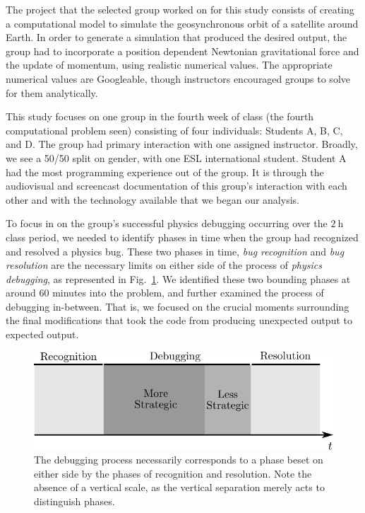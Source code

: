 \documentclass{msuphddissertation}
\begin{document}
\begin{doublespace}
The project that the selected group worked on for this study consists of creating a computational model to simulate the geosynchronous orbit of a satellite around Earth.  In order to generate a simulation that produced the desired output, the group had to incorporate a position dependent Newtonian gravitational force and the update of momentum, using realistic numerical values.  The appropriate numerical values are Googleable, though instructors encouraged groups to solve for them analytically.

This study focuses on one group in the fourth week of class (the fourth computational problem seen) consisting of four individuals: Students A, B, C, and D.  The group had primary interaction with one assigned instructor.  Broadly, we see a 50/50 split on gender, with one ESL international student.  Student A had the most programming experience out of the group.  It is through the audiovisual and screencast documentation of this group's interaction with each other and with the technology available that we began our analysis.

To focus in on the group's successful physics debugging occurring over the $\SI{2}{\hour}$ class period, we needed to identify phases in time when the group had recognized and resolved a physics bug.  These two phases in time, \emph{bug recognition} and \emph{bug resolution} are the necessary limits on either side of the process of \emph{physics debugging}, as represented in Fig.~\ref{CH4:Strategies}.  We identified these two bounding phases at around 60 minutes into the problem, and further examined the process of debugging in-between.  That is, we focused on the crucial moments surrounding the final modifications that took the code from producing unexpected output to expected output.

\begin{figure}\centering
\includegraphics[scale=1]{./images/CH4Strategies.pdf}
\caption{The debugging process necessarily corresponds to a phase beset on either side by the phases of recognition and resolution.  Note the absence of a vertical scale, as the vertical separation merely acts to distinguish phases.}\label{CH4:Strategies}
\end{figure}


\end{doublespace}
\end{document}

